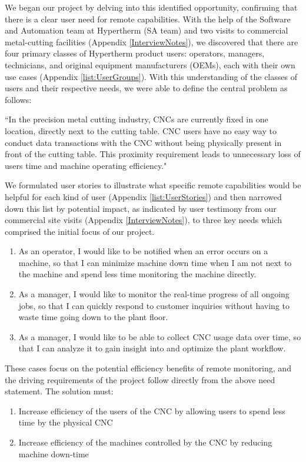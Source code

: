 \documentclass[12pt,letterpaper,titlepage]{article}
\newlength{\wideitemsep}
\let\olditem\item
\renewcommand{\item}{\setlength{\itemsep}{\wideitemsep}\olditem}
\begin{document}
We began our project by delving into this identified opportunity, confirming that there is a clear user need for remote capabilities. With the help of the Software and Automation
team at Hypertherm (SA team) and two visits to commercial metal-cutting facilities
(Appendix \ref{InterviewNotes}), we discovered that there are four primary classes of Hypertherm
product users: operators, managers, technicians, and original equipment manufacturers (OEMs), each with their own use cases (Appendix \ref{list:UserGroups}). With this understanding of the classes of users and their respective needs, we were able to define the central problem as follows:

“In the precision metal cutting industry, CNCs are currently fixed in one location, directly
next to the cutting table. CNC users have no easy way to conduct data transactions
with the CNC without being physically present in front of the cutting table. This proximity
requirement leads to unnecessary loss of users time and machine operating efficiency."

We formulated user stories to illustrate what specific remote capabilities would be helpful
for each kind of user (Appendix \ref{list:UserStories}) and then narrowed down this list by potential impact,
as indicated by user testimony from our commercial site visits (Appendix \ref{InterviewNotes}), to three key
needs which comprised the initial focus of our project.

\begin{enumerate}
\item As an operator, I would like to be notified when an error occurs on a machine, so that I can minimize machine down time when I am not next to the machine and spend less time monitoring the machine directly.
\item As a manager, I would like to monitor the real-time progress of all ongoing jobs, so that I can quickly respond to customer inquiries without having to waste time going down to the plant floor.
\item As a manager, I would like to be able to collect CNC usage data over time, so that I can analyze it to gain insight into and optimize the plant workflow.
\end{enumerate}

These cases focus on the potential efficiency benefits of remote monitoring, and the driving requirements of the project follow directly from the above need statement. The solution must:
\begin{enumerate}
\item Increase efficiency of the users of the CNC by allowing users to spend less time by the physical CNC
\item Increase efficiency of the machines controlled by the CNC by reducing machine down-time 
\end{enumerate}
\end{document}
